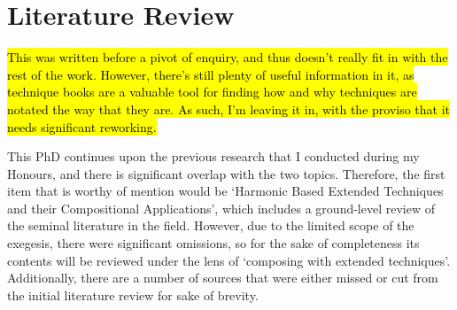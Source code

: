 \section{Literature Review}
\hl{This was written before a pivot of enquiry, and thus doesn't really fit in with the rest of the work. 
However, there's still plenty of useful information in it, as technique books are a valuable tool for finding how and why techniques are notated the way that they are.
As such, I'm leaving it in, with the proviso that it needs significant reworking.}

This PhD continues upon the previous research that I conducted during my Honours, and there is significant overlap with the two topics.
Therefore, the first item that is worthy of mention would be `Harmonic Based Extended Techniques and their Compositional Applications', which includes a ground-level review of the seminal literature in the field.\autocite{grayHarmonicBasedExtended2019}
However, due to the limited scope of the exegesis, there were significant omissions, so for the sake of completeness its contents will be reviewed under the lens of `composing with extended techniques'.
Additionally, there are a number of sources that were either missed or cut from the initial literature review for sake of brevity.

